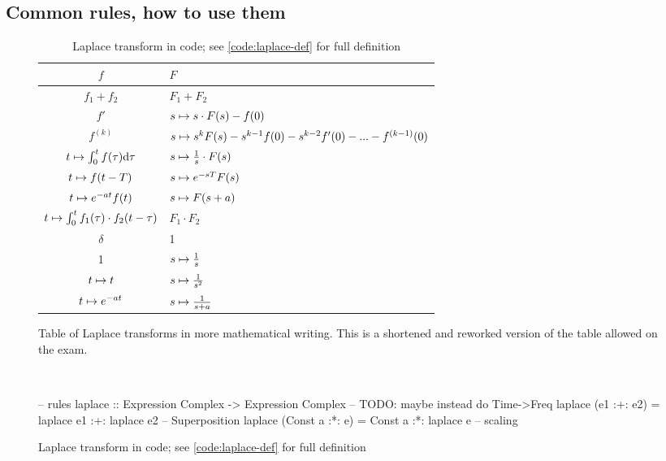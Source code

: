 \subsection{Common rules, how to use them}\label{sec:common-rules}

\begin{table}
    \centering
    \caption{Two tables of the Laplace transform.}
    \label{fig:laplace_tables}
\begin{subfigure}{0.999\textwidth}
    \centering
    \caption{Table of Laplace transforms in more mathematical writing. This is a shortened and reworked version of the table allowed on the exam.}
    \label{fig:laplace_table_ord}
    \begin{tabular}{c|p{5cm}}
    $f$ & $F$ \\ \hline 
    $f_1 + f_2$ & $F_1 + F_2$ \\ 
    $f'$ & $s \mapsto s \cdot F(s) - f(0)$ \\
    $f^{(k)}$ & $s \mapsto s^k F(s) - s^{k-1} f(0) - s^{k-2}f'(0) - ... - f^{(k-1)}(0)$ \\
    $t \mapsto \int_0^t f(\tau) \dd \tau$ & $s \mapsto \frac{1}{s} \cdot F(s)$\\
    $t \mapsto f(t - T)$ & $s \mapsto e^{-sT}F(s)$ \\ 
    $t \mapsto e^{-at}f(t)$ & $s \mapsto F(s+a)$ \\ 
    $t \mapsto \int_0^t f_1(\tau) \cdot f_2(t - \tau)$ & $F_1 \cdot F_2$ \\
    $\delta$ & 1 \\ 
    1 & $s \mapsto \frac{1}{s}$ \\
    $t \mapsto t$ & $s \mapsto \frac{1}{s^2}$ \\ 
    $t \mapsto e^{-at}$ & $s \mapsto \frac{1}{s+a}$
    \end{tabular}
\end{subfigure} \\
\begin{subfigure}{0.999\textwidth} 
    \centering
    \caption{Laplace transform in code; see \ref{code:laplace-def} for full definition}
    \label{fig:laplace_table_code}
    \begin{code'}
-- rules
laplace :: Expression Complex -> Expression Complex -- TODO: maybe instead do Time->Freq
laplace (e1 :+: e2) = laplace e1 :+: laplace e2 -- Superposition
laplace (Const a :*: e) = Const a :*: laplace e -- scaling

\end{code'}
\end{subfigure}
\end{table}
